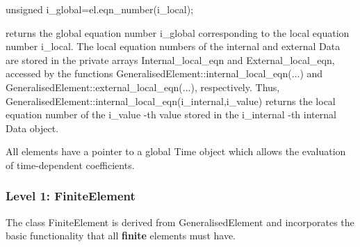 \begin{DoxyItemize}
\begin{DoxyItemize}
\begin{DoxyCode}
\textcolor{keywordtype}{unsigned} i\_global=el.eqn\_number(i\_local); 
\end{DoxyCode}
 returns the global equation number {\ttfamily i\+\_\+global} corresponding to the local equation number {\ttfamily i\+\_\+local}. The local equation numbers of the internal and external {\ttfamily Data} are stored in the private arrays {\ttfamily Internal\+\_\+local\+\_\+eqn} and {\ttfamily External\+\_\+local\+\_\+eqn}, accessed by the functions {\ttfamily Generalised\+Element\+::internal\+\_\+local\+\_\+eqn}(...) and {\ttfamily Generalised\+Element\+::external\+\_\+local\+\_\+eqn}(...), respectively. Thus, {\ttfamily Generalised\+Element\+::internal\+\_\+local\+\_\+eqn(i\+\_\+internal,i\+\_\+value)} returns the local equation number of the {\ttfamily i\+\_\+value} -\/th value stored in the {\ttfamily i\+\_\+internal} -\/th internal {\ttfamily Data} object.
\item All elements have a pointer to a global {\ttfamily Time} object which allows the evaluation of time-\/dependent coefficients.
\end{DoxyItemize}
\end{DoxyItemize}\hypertarget{index_Finite_Element}{}\subsubsection{Level 1\+: Finite\+Element}\label{index_Finite_Element}
The class {\ttfamily Finite\+Element} is derived from {\ttfamily Generalised\+Element} and incorporates the basic functionality that all {\bfseries finite} elements must have.


